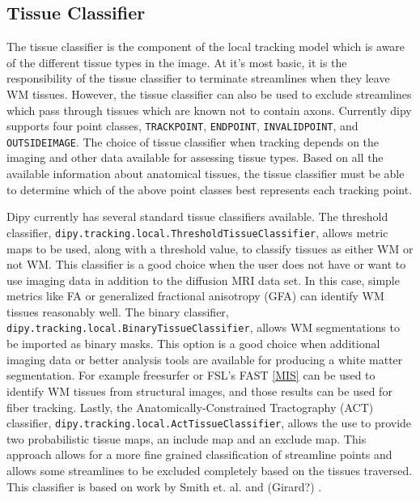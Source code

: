 \subsection{Tissue Classifier}
    The tissue classifier is the component of the local tracking model which is aware of the different tissue types in the image. At it's most basic, it is the responsibility of the tissue classifier to terminate streamlines when they leave WM tissues. However, the tissue classifier can also be used to exclude streamlines which pass through tissues which are known not to contain axons. Currently dipy supports four point classes, \verb|TRACKPOINT|, \verb|ENDPOINT|, \verb|INVALIDPOINT|, and \verb|OUTSIDEIMAGE|. The choice of tissue classifier when tracking depends on the imaging and other data available for assessing tissue types. Based on all the available information about anatomical tissues, the tissue classifier must be able to determine which of the above point classes best represents each tracking point.
    
    Dipy currently has several standard tissue classifiers available. The threshold classifier, \verb|dipy.tracking.local.ThresholdTissueClassifier|, allows metric maps to be used, along with a threshold value, to classify tissues as either WM or not WM. This classifier is a good choice when the user does not have or want to use imaging data in addition to the diffusion MRI data set. In this case, simple metrics like FA or generalized fractional anisotropy (GFA) can identify WM tissues reasonably well. The binary classifier, \verb|dipy.tracking.local.BinaryTissueClassifier|, allows WM segmentations to be imported as binary masks. This option is a good choice when additional imaging data or better analysis tools are available for producing a white matter segmentation. For example freesurfer \cite{MIS} or FSL's FAST \ref{MIS} can be used to identify WM tissues from structural images, and those results can be used for fiber tracking. Lastly, the Anatomically-Constrained Tractography (ACT) classifier, \verb|dipy.tracking.local.ActTissueClassifier|, allows the use to provide two probabilistic tissue maps, an include map and an exclude map. This approach allows for a more fine grained classification of streamline points and allows some streamlines to be excluded completely based on the tissues traversed. This classifier is based on work by Smith et. al. \cite{Smith_2012} and (Girard?) \cite{MIS}.
    
